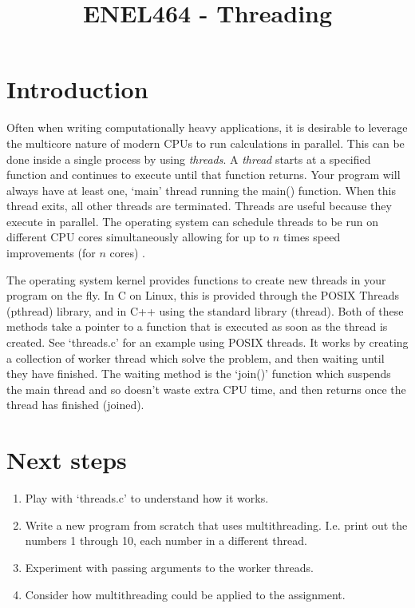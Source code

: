 \documentclass[a4paper,11pt]{article}
\begin{document}
\title{ \bf ENEL464 - Threading }
\author{}
\date{}
\maketitle


\section{Introduction}

Often when writing computationally heavy applications, it is desirable to
leverage the multicore nature of modern CPUs to run calculations in parallel.
This can be done inside a single process by using \emph{threads}. A
\emph{thread} starts at a specified function and continues to execute until that
function returns. Your program will always have at least one, `main' thread
running the main() function. When this thread exits, all other threads are
terminated. Threads are useful because they execute in parallel. The operating
system can schedule threads to be run on different CPU cores simultaneously
allowing for up to $n$ times speed improvements (for $n$ cores) \footnotemark.

The operating system kernel provides functions to create new threads in your
program on the fly. In C on Linux, this is provided through the POSIX Threads
(pthread) library, and in C++ using the standard library (thread). Both of these
methods take a pointer to a function that is executed as soon as the thread is
created. See `threads.c' for an example using POSIX threads. It works by
creating a collection of worker thread which solve the problem, and then waiting
until they have finished. The waiting method is the `join()' function which
suspends the main thread and so doesn't waste extra CPU time, and then returns
once the thread has finished (joined).


\section{Next steps}

\begin{enumerate}
    \item Play with `threads.c' to understand how it works.
    \item Write a new program from scratch that uses multithreading. I.e. print
          out the numbers 1 through 10, each number in a different thread.
    \item Experiment with passing arguments to the worker threads.
    \item Consider how multithreading could be applied to the assignment.
\end{enumerate}
\end{document}
